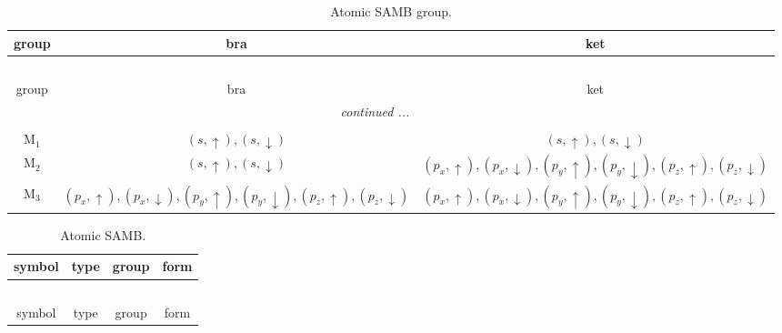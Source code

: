 \documentclass[fleqn,10pt,landscape]{article}
\begin{document}
\begin{itemize}
\begin{dmath*}
\end{dmath*}
\begin{center}
\renewcommand{\arraystretch}{1.3}
\begin{longtable}{c|c|c}
\caption{Atomic SAMB group.}
 \\
 \hline \hline
group & bra & ket \\ \hline \endfirsthead

\multicolumn{2}{l}{\tablename\ \thetable{}} \\
 \hline \hline
group & bra & ket \\ \hline \endhead

 \hline \hline
\multicolumn{2}{r}{\footnotesize\it continued ...} \\ \endfoot

 \hline \hline
\multicolumn{2}{r}{} \\ \endlastfoot

M$_{1}$ & $(s,\uparrow), (s,\downarrow)$ & $(s,\uparrow), (s,\downarrow)$ \\
M$_{2}$ & $(s,\uparrow), (s,\downarrow)$ & $(p_{x},\uparrow), (p_{x},\downarrow), (p_{y},\uparrow), (p_{y},\downarrow), (p_{z},\uparrow), (p_{z},\downarrow)$ \\
M$_{3}$ & $(p_{x},\uparrow), (p_{x},\downarrow), (p_{y},\uparrow), (p_{y},\downarrow), (p_{z},\uparrow), (p_{z},\downarrow)$ & $(p_{x},\uparrow), (p_{x},\downarrow), (p_{y},\uparrow), (p_{y},\downarrow), (p_{z},\uparrow), (p_{z},\downarrow)$ \\
\end{longtable}
\end{center}
\begin{center}
\renewcommand{\arraystretch}{1.3}
\begin{longtable}{c|c|c|c}
\caption{Atomic SAMB.}
 \\
 \hline \hline
symbol & type & group & form \\ \hline \endfirsthead

\multicolumn{3}{l}{\tablename\ \thetable{}} \\
 \hline \hline
symbol & type & group & form \\ \hline \endhead


\end{longtable}
\end{center}
\end{itemize}
\end{document}
